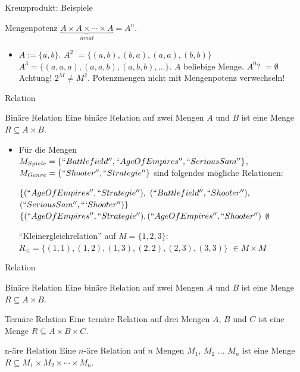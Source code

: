 \begin{frame}{Kreuzprodukt: Beispiele}
	
	\begin{block}{Mengenpotenz}
		$\underbrace{A \times A \times \cdots \times A}_{n mal} = A^n$.
	\end{block}\pause
	
	\begin{itemize}
		\item $A := \{a, b\}$. \pause $A^2$ \pause $ = \{(a, b), (b, a), (a, a), (b, b)\}$ \pause $A^3 = \{(a, a, a), (a, a, b), (a, b, b), \dots\}$.
		\pitem $A$ beliebige Menge. \pause $A^0$? \pause $ = \emptyset$ 
		\pitem Achtung! $2^M \neq M^2$. \pause Potenzmengen nicht mit Mengenpotenz verwechseln!
	\end{itemize}
	
\end{frame}

\begin{frame}{Relation}
	\pause
	
	\begin{block}{Binäre Relation}
		Eine binäre Relation auf zwei Mengen $A$ und $B$ ist eine Menge $R \subseteq A \times B$.
	\end{block}\pause
	
	\begin{itemize}
		\item Für die Mengen $M_{Spiele} = \{``Battlefield'', ``AgeOfEmpires'', ``SeriousSam''\}$, $M_{Genre} = \{``Shooter'', ``Strategie''\}$ sind folgendes mögliche Relationen:
		\begin{itemize}
			\pitem $\{(``Age Of Empires'', ``Strategie''),$ $(``Battlefield'', ``Shooter''),$ $(``Serious Sam'', ```Shooter'')\}$
			\pitem $\{(``Age Of Empires'', ``Strategie''), (``Age Of Empires'', ``Shooter'')$
			\pitem $\emptyset$
		\end{itemize}
		\pitem ``Kleinergleichrelation'' auf $M = \{1, 2, 3\}$\pause : $R_\leq = \{(1, 1), (1, 2), (1, 3), (2, 2), (2, 3), (3, 3)\}$ \pause $\in M \times M$
	\end{itemize}
\end{frame}


\begin{frame}{Relation}
	\begin{block}{Binäre Relation}
		Eine binäre Relation auf zwei Mengen $A$ und $B$ ist eine Menge $R \subseteq A \times B$.
	\end{block}\pause
	
	\begin{block}{Ternäre Relation}
		Eine ternäre Relation auf drei Mengen $A$, $B$ und $C$ ist eine Menge $R \subseteq A \times B \times C$.
	\end{block}\pause
	
	\begin{block}{n-äre Relation}
		Eine $n$-äre Relation auf $n$ Mengen $M_1$, $M_2$ ... $M_n$ ist eine Menge $R \subseteq M_1 \times M_2 \times \cdots \times M_n$.
	\end{block}
\end{frame}

